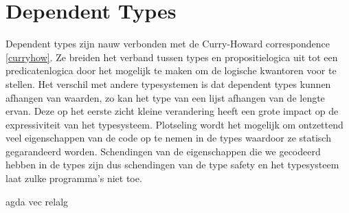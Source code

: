 \section{Dependent Types}

Dependent types zijn nauw verbonden met de Curry-Howard correspondence
\ref{curryhow}. Ze breiden het verband tussen types en propositielogica uit tot
een predicatenlogica door het mogelijk te maken om de logische kwantoren voor
te stellen. Het verschil met andere typesystemen is dat dependent types kunnen
afhangen van waarden, zo kan het type van een lijst afhangen van de lengte
ervan. Deze op het eerste zicht kleine verandering heeft een grote impact op de
expressiviteit van het typesysteem. Plotseling wordt het mogelijk om ontzettend
veel eigenschappen van de code op te nemen in de types waardoor ze statisch
gegarandeerd worden. Schendingen van de eigenschappen die we gecodeerd hebben
in de types zijn dus schendingen van de type safety en het typesysteem laat
zulke programma's niet toe.


agda
vec relalg
